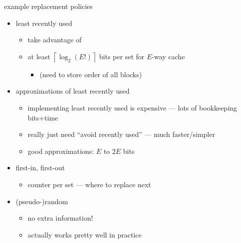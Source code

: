 \begin{frame}{example replacement policies}
\begin{itemize}
    \item least recently used
        \begin{itemize}
        \item take advantage of 
        \item at least $\left\lceil\log_2(E!)\right\rceil$ bits per set for $E$-way cache
            \begin{itemize}
            \item (need to store order of all blocks)
            \end{itemize}
        \end{itemize}
    \item approximations of least recently used
        \begin{itemize}
        \item implementing least recently used is expensive --- lots of bookkeeping bits+time
        \item really just need ``avoid recently used'' --- much faster/simpler
        \item good approximations: $E$ to $2E$ bits
        \end{itemize}
    \item first-in, first-out
        \begin{itemize}
        \item counter per set --- where to replace next
        \end{itemize}
    \item (pseudo-)random
        \begin{itemize}
        \item no extra information!
        \item actually works pretty well in practice
        \end{itemize}
\end{itemize}
\end{frame}

